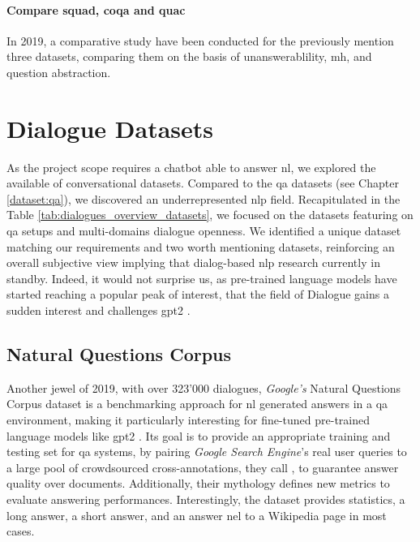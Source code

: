 \paragraph{Compare \gls{squad}, \gls{coqa} and \gls{quac}}
In 2019, a comparative study \autocite{paper:journals/corr/abs-1809-10735} have been conducted for the previously mention three datasets, comparing them on the basis of unanswerablility, \gls{mh}, and question abstraction.


\section{Dialogue Datasets}
\label{dataset:dialogue}
As the project scope requires a chatbot able to answer \gls{nl}, we explored the available of conversational datasets. Compared to the \gls{qa} datasets (see Chapter \ref{dataset:qa}), we discovered an underrepresented \gls{nlp} field. Recapitulated in the Table \ref{tab:dialogues_overview_datasets}, we focused on the datasets featuring on \gls{qa} setups and multi-domains dialogue openness. We identified a unique dataset matching our requirements and two worth mentioning datasets, reinforcing an overall subjective view implying that dialog-based \gls{nlp} research currently in standby. Indeed, it would not surprise us, as pre-trained language models have started reaching a popular peak of interest, that the field of Dialogue gains a sudden interest and challenges \gls{gpt2} \autocite{papers:gpt2}.


\subsection{Natural Questions Corpus}
\label{dataset:googlenatural}
Another jewel of 2019, with over 323'000 dialogues, \textit{Google's} Natural Questions Corpus dataset \autocite{paper:google-natural-questions} is a benchmarking approach for \gls{nl} generated answers in a \gls{qa} environment, making it particularly interesting for fine-tuned pre-trained language models like \gls{gpt2} \autocite{papers:gpt2}. Its goal is to provide an appropriate training and testing set for \gls{qa} systems, by pairing \textit{Google Search Engine}'s real user queries to a large pool of crowdsourced cross-annotations, they call , to guarantee answer quality over documents. Additionally, their mythology defines new metrics to evaluate answering performances. Interestingly, the dataset provides statistics, a long answer, a short answer, and an answer \gls{nel} to a Wikipedia page in most cases.

